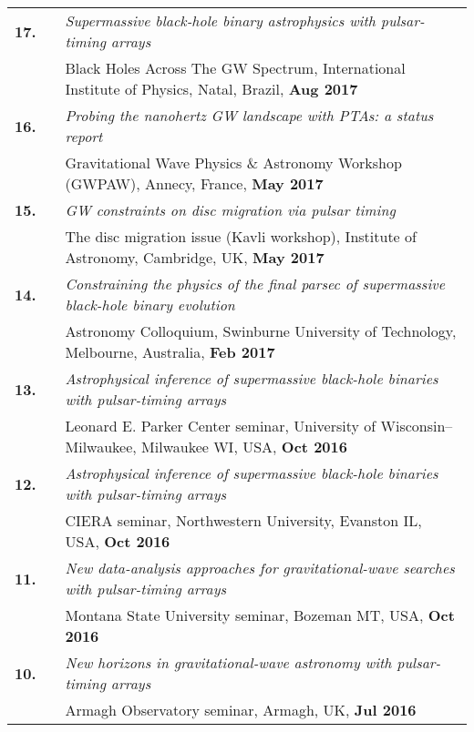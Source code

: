 \documentclass[11pt,letterpaper,sans]{moderncv}
\begin{document}
{\begin{longtable}{rp{0.3cm}p{15.8cm}}
\textbf{17.} & & \textit{Supermassive black-hole binary astrophysics with pulsar-timing arrays} \\
&& Black Holes Across The GW Spectrum, International Institute of Physics, Natal, Brazil, \textbf{Aug 2017} \vspace{0.09cm}\\
\textbf{16.} & & \textit{Probing the nanohertz GW landscape with PTAs: a status report} \\
&& Gravitational Wave Physics \& Astronomy Workshop (GWPAW), Annecy, France, \textbf{May 2017} \vspace{0.09cm}\\
\textbf{15.} & & \textit{GW constraints on disc migration via pulsar timing} \\
&& The disc migration issue (Kavli workshop), Institute of Astronomy, Cambridge, UK, \textbf{May 2017} \vspace{0.09cm}\\
\textbf{14.} & & \textit{Constraining the physics of the final parsec of supermassive black-hole binary evolution} \\ 
&& Astronomy Colloquium, Swinburne University of Technology, Melbourne, Australia, \textbf{Feb 2017} \vspace{0.09cm}\\
\textbf{13.} & & \textit{Astrophysical inference of supermassive black-hole binaries with pulsar-timing arrays} \\ 
&& Leonard E. Parker Center seminar, University of Wisconsin--Milwaukee, Milwaukee WI, USA, \textbf{Oct 2016} \vspace{0.09cm}\\
\textbf{12.} & & \textit{Astrophysical inference of supermassive black-hole binaries with pulsar-timing arrays} \\ 
&& CIERA seminar, Northwestern University, Evanston IL, USA, \textbf{Oct 2016} \vspace{0.09cm}\\
\textbf{11.} & & \textit{New data-analysis approaches for gravitational-wave searches with pulsar-timing arrays} \\ 
&& Montana State University seminar, Bozeman MT, USA, \textbf{Oct 2016} \vspace{0.09cm}\\
\textbf{10.} & & \textit{New horizons in gravitational-wave astronomy with pulsar-timing arrays} \\ 
&& Armagh Observatory seminar, Armagh, UK, \textbf{Jul 2016} \vspace{0.09cm}\\

\end{longtable}}
\end{document}
